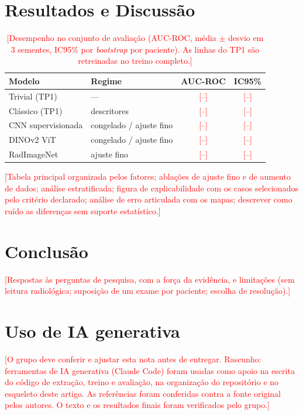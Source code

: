 \documentclass[conference]{IEEEtran}
\newcommand{\pend}[1]{\textcolor{red}{[#1]}}
\begin{document}
\section{Resultados e Discussão}
\begin{table}[t]
\centering
\caption{\pend{Desempenho no conjunto de avaliação (AUC-ROC, média $\pm$ desvio em 3 sementes, IC95\% por \textit{bootstrap} por paciente). As linhas do TP1 são retreinadas no treino completo.}}
\small
\begin{tabular}{@{}llcc@{}}
\toprule
Modelo & Regime & AUC-ROC & IC95\% \\
\midrule
Trivial (TP1) & --- & \pend{--} & \pend{--} \\
Clássico (TP1) & descritores & \pend{--} & \pend{--} \\
CNN supervisionada & congelado / ajuste fino & \pend{--} & \pend{--} \\
DINOv2 ViT & congelado / ajuste fino & \pend{--} & \pend{--} \\
RadImageNet & ajuste fino & \pend{--} & \pend{--} \\
\bottomrule
\end{tabular}
\end{table}

\pend{Tabela principal organizada pelos fatores; ablações de ajuste fino e de aumento de dados; análise estratificada; figura de explicabilidade com os casos selecionados pelo critério declarado; análise de erro articulada com os mapas; descrever como ruído as diferenças sem suporte estatístico.}

\section{Conclusão}
\pend{Respostas às perguntas de pesquisa, com a força da evidência, e limitações (sem leitura radiológica; suposição de um exame por paciente; escolha de resolução).}

\section*{Uso de IA generativa}
\pend{O grupo deve conferir e ajustar esta nota antes de entregar. Rascunho: ferramentas de IA generativa (Claude Code) foram usadas como apoio na escrita do código de extração, treino e avaliação, na organização do repositório e no esqueleto deste artigo. As referências foram conferidas contra a fonte original pelos autores. O texto e os resultados finais foram verificados pelo grupo.}



\end{document}
